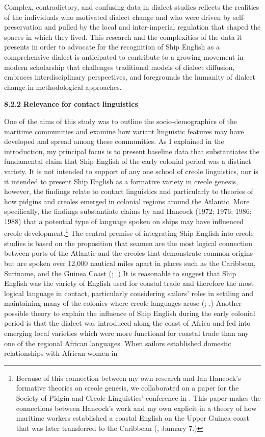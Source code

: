 Complex, contradictory, and confusing data in dialect studies reflects the realities of the individuals who motivated dialect change and who were driven by self-preservation and pulled by the local and inter-imperial regulation that shaped the spaces in which they lived. This research and the complexities of the data it presents in order to advocate for the recognition of Ship English as a comprehensive dialect is anticipated to contribute to a growing movement in modern scholarship that challenges traditional models of dialect diffusion, embraces interdisciplinary perspectives, and foregrounds the humanity of dialect change in methodological approaches. 

\textbf{8.2.2} \textbf{Relevance} \textbf{for} \textbf{contact} \textbf{linguistics}

One of the aims of this study was to outline the socio-demographics of the maritime communities and examine how variant linguistic features may have developed and spread among these communities. As I explained in the introduction, my principal focus is to present baseline data that substantiates the fundamental claim that Ship English of the early colonial period was a distinct variety. It is not intended to support of any one school of creole linguistics, nor is it intended to present Ship English as a formative variety in creole genesis, however, the findings relate to contact linguistics and particularly to theories of how pidgins and creoles emerged in colonial regions around the Atlantic. More specifically, the findings substantiate claims by \citet{Reinecke1938} and Hancock (1972; 1976; 1986; 1988) that a potential type of language spoken on ships may have influenced creole development.\footnote{Because of this connection between my own research and Ian Hancock’s formative theories on creole genesis, we collaborated on a paper for the Society of Pidgin and Creole Linguistics’ conference in \citealt{January2017}. This paper makes the connections between Hancock’s work and my own explicit in a theory of how maritime workers established a coastal English on the Upper Guinea coast that was later transferred to the Caribbean (\citealt{DelgadoHancock2017}, January 7.)} The central premise of integrating Ship English into creole studies is based on the proposition that seamen are the most logical connection between ports of the Atlantic and the creoles that demonstrate common origins but are spoken over 12,000 nautical miles apart in places such as the Caribbean, Suriname, and the Guinea Coast (\citealt{Hancock1976}; \citealt{FaraclasEtAl2012}.) It is reasonable to suggest that Ship English was the variety of English used for coastal trade and therefore the most logical language in contact, particularly considering sailors’ roles in settling and maintaining many of the colonies where creole languages arose (\citealt{BaileyRoss1988}; \citealt{Holm1988}.) Another possible theory to explain the influence of Ship English during the early colonial period is that the dialect was introduced along the coast of Africa and fed into emerging local varieties which were more functional for coastal trade than any one of the regional African languages. When sailors established domestic relationships with African women in 